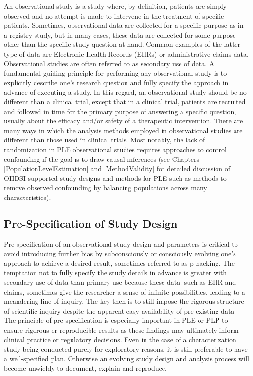 \documentclass[11pt]{book}
\theoremstyle{definition}
\theoremstyle{definition}
\theoremstyle{definition}
\theoremstyle{remark}
\begin{document}
An observational study is a study where, by definition, patients are
simply observed and no attempt is made to intervene in the treatment of
specific patients. Sometimes, observational data are collected for a
specific purpose as in a registry study, but in many cases, these data
are collected for some purpose other than the specific study question at
hand. Common examples of the latter type of data are Electronic Health
Records (EHRs) or administrative claims data. Observational studies are
often referred to as secondary use of data. A fundamental guiding
principle for performing any observational study is to explicitly
describe one's research question and fully specify the approach in
advance of executing a study. In this regard, an observational study
should be no different than a clinical trial, except that in a clinical
trial, patients are recruited and followed in time for the primary
purpose of answering a specific question, usually about the efficacy
and/or safety of a therapeutic intervention. There are many ways in
which the analysis methods employed in observational studies are
different than those used in clinical trials. Most notably, the lack of
randomization in PLE observational studies requires approaches to
control confounding if the goal is to draw causal inferences (see
Chapters \ref{PopulationLevelEstimation} and \ref{MethodValidity} for
detailed discussion of OHDSI-supported study designs and methods for PLE
such as methods to remove observed confounding by balancing populations
across many characteristics).

\subsection{Pre-Specification of Study
Design}\label{pre-specification-of-study-design}

Pre-specification of an observational study design and parameters is
critical to avoid introducing further bias by subconsciously or
consciously evolving one's approach to achieve a desired result,
sometimes referred to as p-hacking. The temptation not to fully specify
the study details in advance is greater with secondary use of data than
primary use because these data, such as EHR and claims, sometimes give
the researcher a sense of infinite possibilities, leading to a
meandering line of inquiry. The key then is to still impose the rigorous
structure of scientific inquiry despite the apparent easy availability
of pre-existing data. The principle of pre-specification is especially
important in PLE or PLP to ensure rigorous or reproducible results as
these findings may ultimately inform clinical practice or regulatory
decisions. Even in the case of a characterization study being conducted
purely for exploratory reasons, it is still preferable to have a
well-specified plan. Otherwise an evolving study design and analysis
process will become unwieldy to document, explain and reproduce.
\end{document}
